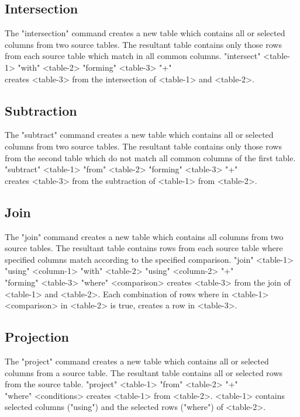\subsection{Intersection}
%
The "intersection" command creates a new table which contains all
or selected columns from two source tables.  The resultant
table contains only those rows from each source table
which
match in all common columns.
\<"intersect" <table-1> "with" <table-2> "forming" <table-3> "+"\\
  \qquad  {}\>
creates <table-3> from the intersection of <table-1> and <table-2>.
 
\subsection{Subtraction}
%
The "subtract" command creates a new table which contains all
or selected columns from two source tables.  The resultant
table contains only those rows from the second table
which
do not match all common columns of the first table.
\<"subtract" <table-1> "from" <table-2> "forming" <table-3> "+"\\
  \qquad  {}\>
creates <table-3> from the subtraction of <table-1> from <table-2>.
 
\subsection{Join}
%
The "join" command creates a new table which contains all
columns from two source tables.  The resultant
table contains rows from each source table
where specified columns match according to the specified comparison.
\<"join" <table-1> "using" <column-1>
    "with" <table-2> "using" <column-2> "+"\\
  \qquad  "forming" <table-3>
    "where" <comparison> \>
creates <table-3> from the join of <table-1> and <table-2>.
Each combination of rows where
 in <table-1> \qquad <comparison>  in <table-2>\>
is true, creates a row in <table-3>.
 
\subsection{Projection}
%
The "project" command creates a new table which contains all
or selected columns from a source table.  The resultant
table contains all or selected rows from the source table.
\<"project" <table-1> "from" <table-2>
   "+"\\
 \qquad   "where" <conditions> \>
creates <table-1> from <table-2>.
<table-1> contains selected columns ("using") and the
selected rows ("where") of <table-2>.
%
 
